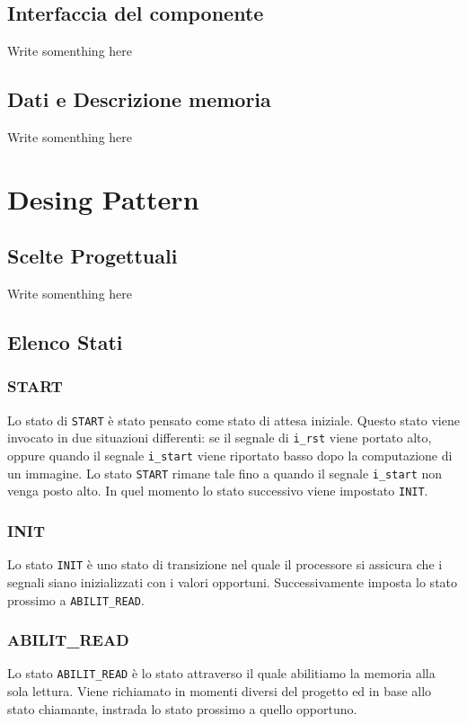 \documentclass[11pt, a4paper]{article}
\begin{document}
\subsection{Interfaccia del componente}
Write somenthing here

\subsection{Dati e Descrizione memoria}
Write somenthing here

\section{Desing Pattern}
\subsection{Scelte Progettuali}
Write somenthing here

\subsection{Elenco Stati}

\subsubsection{START}
Lo stato di \texttt{START} è stato pensato come stato di attesa iniziale. Questo stato viene invocato in due situazioni differenti: se il segnale di \texttt{i\_rst} viene portato alto, oppure quando il segnale \texttt{i\_start} viene riportato basso dopo la computazione di un immagine. Lo stato \texttt{START} rimane tale fino a quando il segnale \texttt{i\_start} non venga posto alto. In quel momento lo stato successivo viene impostato \texttt{INIT}.

\subsubsection{INIT}
Lo stato \texttt{INIT} è uno stato di transizione nel quale il processore si assicura che i segnali siano inizializzati con i valori opportuni. Successivamente imposta lo stato prossimo a \texttt{ABILIT\_READ}.

\subsubsection{ABILIT\_READ}
Lo stato \texttt{ABILIT\_READ} è lo stato attraverso il quale abilitiamo la memoria alla sola lettura. Viene richiamato in momenti diversi del progetto ed in base allo stato chiamante, instrada lo stato prossimo a quello opportuno.
\end{document}
